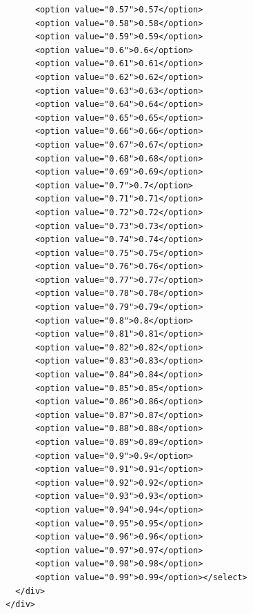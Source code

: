 \documentclass[
  letterpaper,
  DIV=11,
  numbers=noendperiod]{scrartcl}
\begin{document}
\begin{verbatim}
      <option value="0.57">0.57</option>
      <option value="0.58">0.58</option>
      <option value="0.59">0.59</option>
      <option value="0.6">0.6</option>
      <option value="0.61">0.61</option>
      <option value="0.62">0.62</option>
      <option value="0.63">0.63</option>
      <option value="0.64">0.64</option>
      <option value="0.65">0.65</option>
      <option value="0.66">0.66</option>
      <option value="0.67">0.67</option>
      <option value="0.68">0.68</option>
      <option value="0.69">0.69</option>
      <option value="0.7">0.7</option>
      <option value="0.71">0.71</option>
      <option value="0.72">0.72</option>
      <option value="0.73">0.73</option>
      <option value="0.74">0.74</option>
      <option value="0.75">0.75</option>
      <option value="0.76">0.76</option>
      <option value="0.77">0.77</option>
      <option value="0.78">0.78</option>
      <option value="0.79">0.79</option>
      <option value="0.8">0.8</option>
      <option value="0.81">0.81</option>
      <option value="0.82">0.82</option>
      <option value="0.83">0.83</option>
      <option value="0.84">0.84</option>
      <option value="0.85">0.85</option>
      <option value="0.86">0.86</option>
      <option value="0.87">0.87</option>
      <option value="0.88">0.88</option>
      <option value="0.89">0.89</option>
      <option value="0.9">0.9</option>
      <option value="0.91">0.91</option>
      <option value="0.92">0.92</option>
      <option value="0.93">0.93</option>
      <option value="0.94">0.94</option>
      <option value="0.95">0.95</option>
      <option value="0.96">0.96</option>
      <option value="0.97">0.97</option>
      <option value="0.98">0.98</option>
      <option value="0.99">0.99</option></select>
  </div>
</div>
\end{verbatim}
\end{document}
